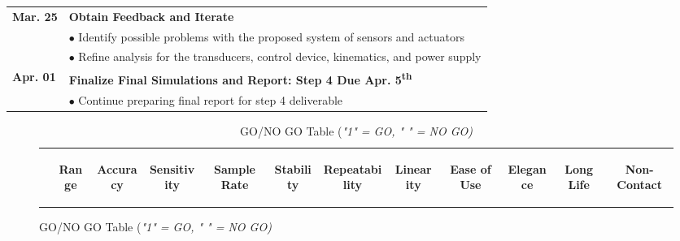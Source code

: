 \documentclass[12pt]{article}
\newcommand{\ts}{\textsuperscript}
\begin{document}
\begin{flushleft}
\begin{tabular}{l | l}
\textbf{Mar. 25} & \textbf{Obtain Feedback and Iterate}\\
  & $\bullet$ Identify possible problems with the proposed system of sensors and actuators\\
  & $\bullet$ Refine analysis for the transducers, control device, kinematics, and power supply\\
  
\textbf{Apr. 01} & \textbf{Finalize Final Simulations and Report: Step 4 Due Apr. 5\ts{th}}\\
 & $\bullet$ Continue preparing final report for step 4 deliverable\\

\end{tabular}
\end{flushleft}

\begin{figure}[htb!]
\begin{table}[H]
  \centering
  \caption{GO/NO GO Table (\textit{"1" = GO, " " = NO GO)}}
    \begin{tabular}{p{15.645em}|c|c|c|c|c|c|c|c|c|c|c}
    \multicolumn{1}{r}{} & \multicolumn{1}{c}{\begin{sideways}\textbf{Range}\end{sideways}} & \multicolumn{1}{c}{\begin{sideways}\textbf{Accuracy}\end{sideways}} & \multicolumn{1}{c}{\begin{sideways}\textbf{Sensitivity}\end{sideways}} & \multicolumn{1}{c}{\begin{sideways}\textbf{Sample Rate}\end{sideways}} & \multicolumn{1}{c}{\begin{sideways}\textbf{Stability}\end{sideways}} & \multicolumn{1}{c}{\begin{sideways}\textbf{Repeatability}\end{sideways}} & \multicolumn{1}{c}{\begin{sideways}\textbf{Linearity}\end{sideways}} & \multicolumn{1}{c}{\begin{sideways}\textbf{Ease of Use}\end{sideways}} & \multicolumn{1}{c}{\begin{sideways}\textbf{Elegance}\end{sideways}} & \multicolumn{1}{c}{\begin{sideways}\textbf{Long Life}\end{sideways}} & \begin{sideways}\textbf{Non-Contact}\end{sideways} \\

\end{tabular}
\end{table}
\end{figure}
\end{document}

